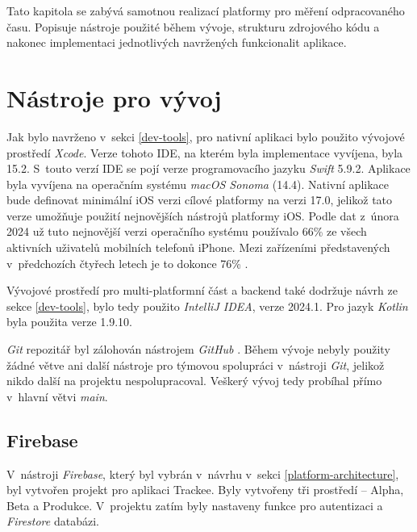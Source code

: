Tato kapitola se zabývá samotnou realizací platformy pro měření odpracovaného času. Popisuje nástroje použité během vývoje, strukturu zdrojového kódu a nakonec implementaci jednotlivých navržených funkcionalit aplikace.

\section{Nástroje pro vývoj}

Jak bylo navrženo v~sekci \ref{dev-tools}, pro nativní aplikaci bylo použito vývojové prostředí \emph{Xcode}. Verze tohoto IDE, na kterém byla implementace vyvíjena, byla 15.2. S~touto verzí IDE se pojí verze programovacího jazyku \emph{Swift} 5.9.2. Aplikace byla vyvíjena na operačním systému \emph{macOS Sonoma} (14.4). Nativní aplikace bude definovat minimální iOS verzi cílové platformy na verzi 17.0, jelikož tato verze umožňuje použití nejnovějších nástrojů platformy iOS. Podle dat z~února 2024 už tuto nejnovější verzi operačního systému používalo 66\% ze všech aktivních uživatelů mobilních telefonů iPhone. Mezi zařízeními představených v~předchozích čtyřech letech je to dokonce 76\% \cite{ios-17-adoption}.

Vývojové prostředí pro multi-platformní část a backend také dodržuje návrh ze sekce \ref{dev-tools}, bylo tedy použito \emph{IntelliJ IDEA}, verze 2024.1. Pro jazyk \emph{Kotlin} byla použita verze 1.9.10. 

\emph{Git} repozitář byl zálohován nástrojem \emph{GitHub} \cite{github}. Během vývoje nebyly použity žádné větve ani další nástroje pro týmovou spolupráci v~nástroji \emph{Git}, jelikož nikdo další na projektu nespolupracoval. Veškerý vývoj tedy probíhal přímo v~hlavní větvi \emph{main}.

\subsection{Firebase}

V~nástroji \emph{Firebase}, který byl vybrán v~návrhu v~sekci \ref{platform-architecture}, byl vytvořen projekt pro aplikaci Trackee. Byly vytvořeny tři prostředí – Alpha, Beta a Produkce. V~projektu zatím byly nastaveny funkce pro autentizaci a \emph{Firestore} databázi. 

